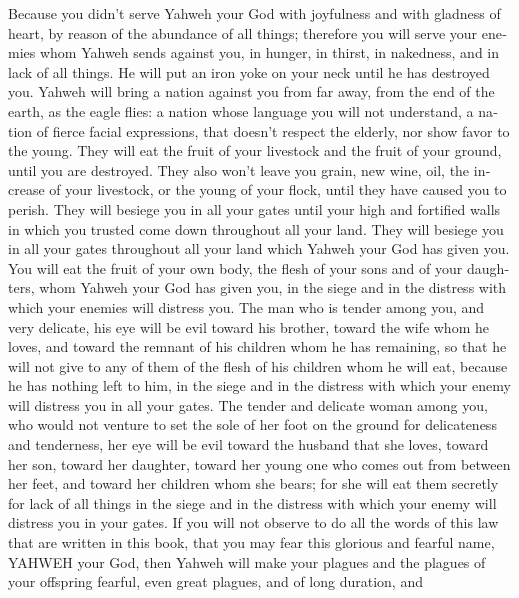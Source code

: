 \begin{paracol}{2}
\begin{otherlanguage}{english}
 Because you didn't serve Yahweh your God with joyfulness
and with gladness of heart, by reason of the abundance of all things;
 therefore you will serve your enemies whom Yahweh sends
against you, in hunger, in thirst, in nakedness, and in lack of all
things. He will put an iron yoke on your neck until he has destroyed
you.  Yahweh will bring a nation against you from far
away, from the end of the earth, as the eagle flies: a nation whose
language you will not understand,  a nation of fierce
facial expressions, that doesn't respect the elderly, nor show favor to
the young.  They will eat the fruit of your livestock and
the fruit of your ground, until you are destroyed. They also won't leave
you grain, new wine, oil, the increase of your livestock, or the young
of your flock, until they have caused you to perish. 
They will besiege you in all your gates until your high and fortified
walls in which you trusted come down throughout all your land. They will
besiege you in all your gates throughout all your land which Yahweh your
God has given you.  You will eat the fruit of your own
body, the flesh of your sons and of your daughters, whom Yahweh your God
has given you, in the siege and in the distress with which your enemies
will distress you.  The man who is tender among you, and
very delicate, his eye will be evil toward his brother, toward the wife
whom he loves, and toward the remnant of his children whom he has
remaining,  so that he will not give to any of them of
the flesh of his children whom he will eat, because he has nothing left
to him, in the siege and in the distress with which your enemy will
distress you in all your gates.  The tender and delicate
woman among you, who would not venture to set the sole of her foot on
the ground for delicateness and tenderness, her eye will be evil toward
the husband that she loves, toward her son, toward her daughter,
 toward her young one who comes out from between her
feet, and toward her children whom she bears; for she will eat them
secretly for lack of all things in the siege and in the distress with
which your enemy will distress you in your gates.  If you
will not observe to do all the words of this law that are written in
this book, that you may fear this glorious and fearful name, YAHWEH your
God,  then Yahweh will make your plagues and the plagues
of your offspring fearful, even great plagues, and of long duration, and

\end{otherlanguage}
\end{paracol}
